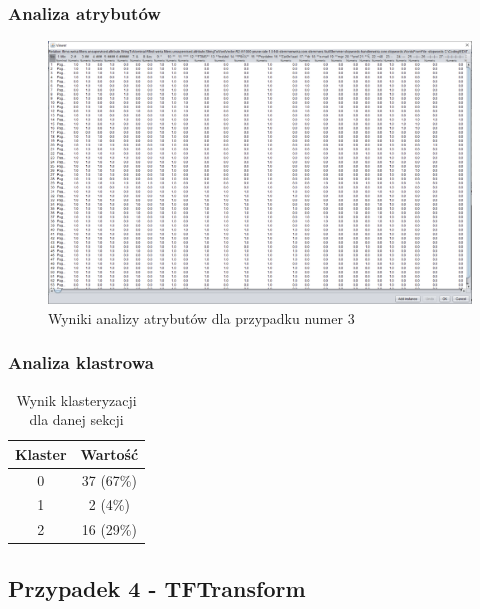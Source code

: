 \documentclass[../EDI_Task2_Karwowski_Kowalewski.tex]{subfiles}
\begin{document}
{{        \subsubsection{Analiza atrybutów} {

            \begin{figure}[!htbp]
                \centering
                \includegraphics[width=\textwidth]{img/results1/ftims-case3.png}
                \caption{Wyniki analizy atrybutów dla przypadku numer 3}
            \end{figure}
            \FloatBarrier
        }

        \subsubsection{Analiza klastrowa} {

            \begin{table}[!htbp]
                \small
                \centering
                \begin{tabular}{|c|c|}
                    \hline
                    Klaster & Wartość \\ \hline
                    0   &  37 (67\%) \\
                    1   &   2 (4\%) \\
                    2   &  16 (29\%) \\ \hline
                \end{tabular}
                \caption{Wynik klasteryzacji dla danej sekcji}
            \end{table}
            \FloatBarrier
        }
    }

    \subsection{Przypadek 4 - TFTransform} {

}}
\end{document}
